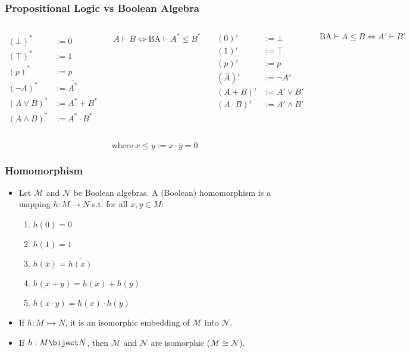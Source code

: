 \documentclass[UTF8,aspectratio=43,11pt,colorlinks,compress,openany]{beamer}%
\begin{document}
\begin{frame}\frametitle{Propositional Logic vs Boolean Algebra}
	\begin{columns}
			\begin{align*}
			(\bot)^*&:=0\\
			(\top)^*&:=1\\
			(p)^*&:=p\\
			(\neg A)^*&:=\overline{A^*}\\
			(A\vee B)^*&:=A^*+B^*\\
			(A\wedge B)^*&:=A^*\cdot B^*
			\end{align*}\setlength\abovedisplayskip{0pt}
			\begin{block}{}
				\[A\vdash B\iff\mathrm{BA}\vdash A^*\leq B^*\]
			\end{block}
			\begin{align*}
			(0)'&:=\bot\\
			(1)'&:=\top\\
			(p)'&:=p\\
			\left(\overline{A}\right)'&:=\neg A'\\
			(A+B)'&:=A'\vee B'\\
			(A\cdot B)'&:=A'\wedge B'
			\end{align*}\setlength\abovedisplayskip{0pt}
			\begin{block}{}
				\[\mathrm{BA}\vdash A\leq B\iff A'\vdash B'\]
			\end{block}
	\end{columns}
	\[\text{where}\; x\leq y:=x\cdot\overline{y}=0\]
\end{frame}

\begin{frame}\frametitle{Homomorphism}
	\begin{itemize}
		\item Let $\mathcal{M}$ and $\mathcal{N}$ be Boolean algebras. A (Boolean) homomorphism is a mapping $h: M\to N$ s.t. for all $x,y\in M$:
		\begin{enumerate}
			\item $h(0)=0$
			\item $h(1)=1$
			\item $h(\overline{x})=\overline{h(x)}$
			\item $h(x+y)=h(x)+h(y)$
			\item $h(x\cdot y)=h(x)\cdot h(y)$
		\end{enumerate}
		\item If $h: M\rightarrowtail N$, it is an isomorphic embedding of $\mathcal{M}$ into $\mathcal{N}$.
		\item If $h: M\biject N$, then $\mathcal{M}$ and $\mathcal{N}$ are isomorphic ($\mathcal{M}\cong\mathcal{N}$). 
	\end{itemize}
\end{frame}
\end{document}
